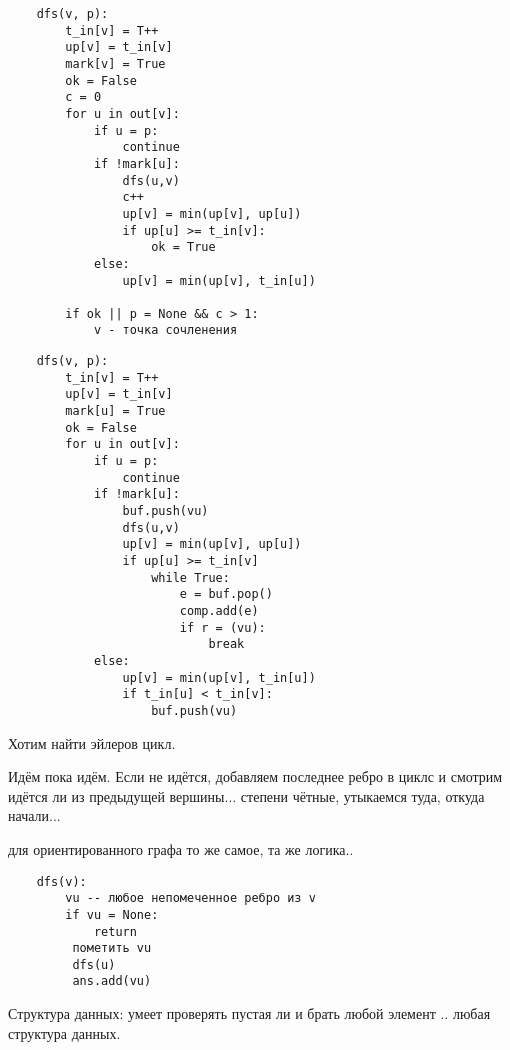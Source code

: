 \documentclass{book}
\theoremstyle{definition}
\begin{document}
\begin{lstlisting}
    dfs(v, p):
        t_in[v] = T++
        up[v] = t_in[v]
        mark[v] = True
        ok = False
        c = 0
        for u in out[v]:
            if u = p:
                continue
            if !mark[u]:
                dfs(u,v)
                c++
                up[v] = min(up[v], up[u])
                if up[u] >= t_in[v]:
                    ok = True
            else:
                up[v] = min(up[v], t_in[u])

        if ok || p = None && c > 1:
            v - точка сочленения
\end{lstlisting}

\begin{lstlisting}
    dfs(v, p):
        t_in[v] = T++
        up[v] = t_in[v]
        mark[u] = True
        ok = False
        for u in out[v]:
            if u = p:
                continue
            if !mark[u]:
                buf.push(vu)
                dfs(u,v)
                up[v] = min(up[v], up[u])
                if up[u] >= t_in[v]
                    while True:
                        e = buf.pop()
                        comp.add(e)
                        if r = (vu):
                            break
            else:
                up[v] = min(up[v], t_in[u])
                if t_in[u] < t_in[v]:
                    buf.push(vu)
\end{lstlisting}

\begin{problem}
    Хотим найти эйлеров цикл.

    Идём пока идём. Если не идётся, добавляем последнее ребро в циклс и смотрим идётся ли из предыдущей вершины... степени чётные, утыкаемся туда, откуда начали...

    для ориентированного графа то же самое, та же логика..
\end{problem} 

\begin{lstlisting}
    dfs(v):
        vu -- любое непомеченное ребро из v
        if vu = None:
            return
         пометить vu
         dfs(u)
         ans.add(vu)
\end{lstlisting}

Структура данных: умеет проверять пустая ли и брать любой элемент .. любая структура данных.
\end{document}
